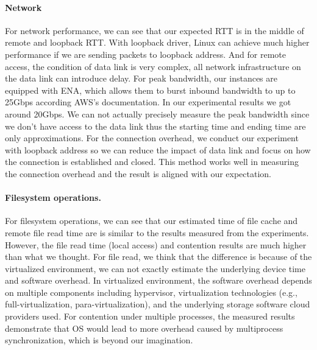 \paragraph{Network} For network performance, we can see that our expected RTT is in the middle of remote and loopback RTT. With loopback driver, Linux can achieve much higher performance if we are sending packets to loopback address. And for remote access, the condition of data link is very complex, all network infrastructure on the data link can introduce delay. For peak bandwidth, our instances are equipped with ENA, which allows them to burst inbound bandwidth to up to 25Gbps according AWS's documentation. In our experimental results we got around 20Gbps. We can not actually precisely measure the peak bandwidth since we don't have access to the data link thus the starting time and ending time are only approximations. For the connection overhead, we conduct our experiment with loopback address so we can reduce the impact of data link and focus on how the connection is established and closed. This method works well in measuring the connection overhead and the result is aligned with our expectation.

\paragraph{Filesystem operations.} For filesystem operations, we can see that our estimated time of file cache and remote file read time are is similar to the results measured from the experiments. However, the file read time (local access) and contention results are much higher than what we thought. For file read, we think that the difference is because of the virtualized environment, we can not exactly estimate the underlying device time and software overhead. In virtualized environment, the software overhead depends on multiple components including hypervisor, virtualization technologies (e.g., full-virtualization, para-virtualization), and the underlying storage software cloud providers used. For contention under multiple processes, the measured results demonstrate that OS would lead to more overhead caused by multiprocess synchronization, which is beyond our imagination.